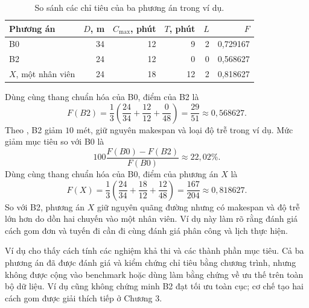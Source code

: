 \begin{table}[H]
\centering\small
\begin{tabular}{lrrrrr}
\toprule
Phương án & $D$, m & $C_{\max}$, phút & $T$, phút & $L$ & $F$ \\
\midrule
B0 & 34 & 12 & 9 & 2 & 0,729167 \\
B2 & 24 & 12 & 0 & 0 & 0,568627 \\
$X$, một nhân viên & 24 & 18 & 12 & 2 & 0,818627 \\
\bottomrule
\end{tabular}
\caption{So sánh các chỉ tiêu của ba phương án trong ví dụ.}\label{tab:example-comparison}
\end{table}

Dùng cùng thang chuẩn hóa của B0, điểm của B2 là
\begin{equation}
 F(B2)=\frac13\left(\frac{24}{34}+\frac{12}{12}+\frac0{48}\right)
 =\frac{29}{51}\approx0{,}568627.\label{eq:model-example-b2}
\end{equation}
Theo , B2 giảm $10$ mét, giữ nguyên makespan và loại độ trễ trong ví dụ. Mức giảm mục tiêu so với B0 là
\begin{equation}
 100\frac{F(B0)-F(B2)}{F(B0)}\approx22{,}02\%.\label{eq:model-example-improvement}
\end{equation}
Dùng cùng thang chuẩn hóa của B0, điểm của phương án $X$ là
\begin{equation}
 F(X)=\frac13\left(\frac{24}{34}+\frac{18}{12}+\frac{12}{48}\right)
 =\frac{167}{204}\approx0{,}818627.\label{eq:model-example-sequential}
\end{equation}
So với B2, phương án $X$ giữ nguyên quãng đường nhưng có makespan và độ trễ lớn hơn do dồn hai chuyến vào một nhân viên. Ví dụ này làm rõ rằng đánh giá cách gom đơn và tuyến đi cần đi cùng đánh giá phân công và lịch thực hiện.

Ví dụ cho thấy cách tính các nghiệm khả thi và các thành phần mục tiêu. Cả ba phương án đã được đánh giá và kiểm chứng chỉ tiêu bằng chương trình, nhưng không được cộng vào benchmark hoặc dùng làm bằng chứng về ưu thế trên toàn bộ dữ liệu. Ví dụ cũng không chứng minh B2 đạt tối ưu toàn cục; cơ chế tạo hai cách gom được giải thích tiếp ở Chương 3.
